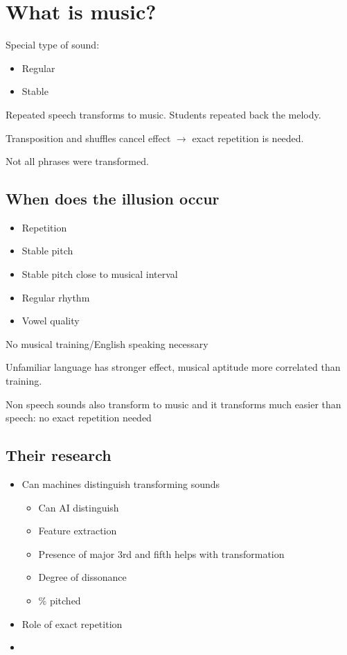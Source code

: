 \section{What is music?}
Special type of sound:
\begin{itemize}
    \item Regular
    \item Stable
\end{itemize}

Repeated speech transforms to music. Students repeated back the melody.

Transposition and shuffles cancel effect \(\to\) exact repetition is needed.

Not all phrases were transformed.

\subsection{When does the illusion occur}
\begin{itemize}
    \item Repetition
    \item Stable pitch
    \item Stable pitch close to musical interval
    \item Regular rhythm
    \item Vowel quality
\end{itemize}

No musical training/English speaking necessary

Unfamiliar language has stronger effect, musical aptitude more correlated than
training.

Non speech sounds also transform to music and it transforms much easier than
speech: no exact repetition needed

\subsection{Their research}
\begin{itemize}
    \item Can machines distinguish transforming sounds

          \begin{itemize}
              \item Can AI distinguish
              \item Feature extraction
              \item Presence of major 3rd and fifth helps with transformation
              \item Degree of dissonance
              \item \(\%\) pitched
          \end{itemize}

    \item Role of exact repetition
    \item
\end{itemize}

